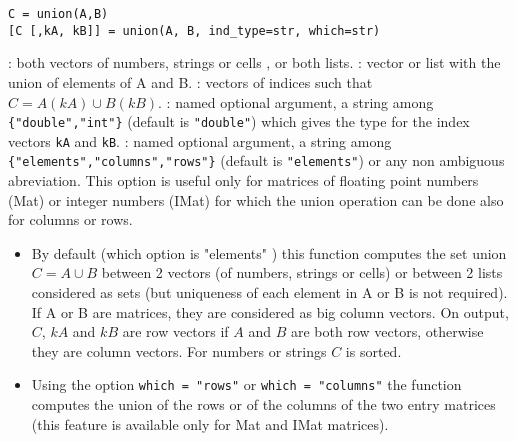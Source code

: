 
\begin{mandesc}
\end{mandesc}

\begin{calling_sequence}
\begin{verbatim}
C = union(A,B)
[C [,kA, kB]] = union(A, B, ind_type=str, which=str)
\end{verbatim}
\end{calling_sequence}
\begin{parameters}
  \begin{varlist}
    : both vectors of numbers, strings or cells , or both lists.
    : vector or list with the union of elements of A and B.
    : vectors of indices such that $C = A(kA) \cup B(kB)$.
    : named optional argument, a string among \verb+{"double","int"}+ (default is \verb+"double"+)
    which gives the type for the index vectors  \verb+kA+ and \verb+kB+. 
    : named optional argument, a string among \verb+{"elements","columns","rows"}+ (default is
    \verb+"elements"+) or any non ambiguous abreviation. This option is useful only for matrices of floating 
       point numbers (Mat) or integer numbers (IMat) for which the union operation can be done also for
       columns or rows.
  \end{varlist}
\end{parameters}

\begin{mandescription}
\begin{itemize}
\item  By default (which option is "elements" ) this function computes the set 
  union $C = A \cup B$ between 2 vectors (of numbers, strings or cells) or between 2
  lists considered as sets (but uniqueness of each element in A or B is not
  required). If A or B are matrices, they  are considered as big column vectors.
   On output, $C$, $kA$ and $kB$ are row vectors if  $A$ and $B$ are both 
  row vectors, otherwise they are column vectors. For numbers or strings $C$ 
  is sorted. 

\item  Using the option \verb+which = "rows"+ or \verb+which = "columns"+  the function 
  computes the union of the rows or of the columns of the two entry 
  matrices (this feature is available only for Mat and IMat matrices).

\end{itemize}

\end{mandescription}

